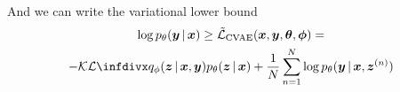 And we can write the variational lower bound
\begin{multline}
\log \ptheta\given{\vy}{\vx} \geq \tilde{\mathcal{L}}_{\text{CVAE}}(\vx, \vy, \vth, \vph) =\\
- \KL{q_{\phi}\given{\vz}{\vx, \vy}}{\ptheta \given{\vz}{\vx}} + \frac{1}{N} \sum^N_{n=1} \log \ptheta \given{\vy}{\vx, \vz^{(n)}}
\end{multline}

